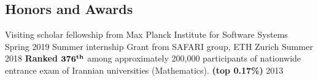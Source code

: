 \documentclass[../main.tex]{subfiles}
\begin{document}
\begin{category}
\section{Honors and Awards}
	\citembullet  Visiting scholar fellowship from Max Planck Institute for Software Systems \hfill Spring 2019
	\citembullet  Summer internship Grant from SAFARI group, ETH Zurich \hfill Summer 2018
    \citembullet \textbf{Ranked $\bf376^{th}$} among approximately 200,000 participants of
    nationwide entrance exam of Irannian universities (Mathematics). \textbf{(top 0.17\%)} \hfill 2013
\end{category}
\end{document}
